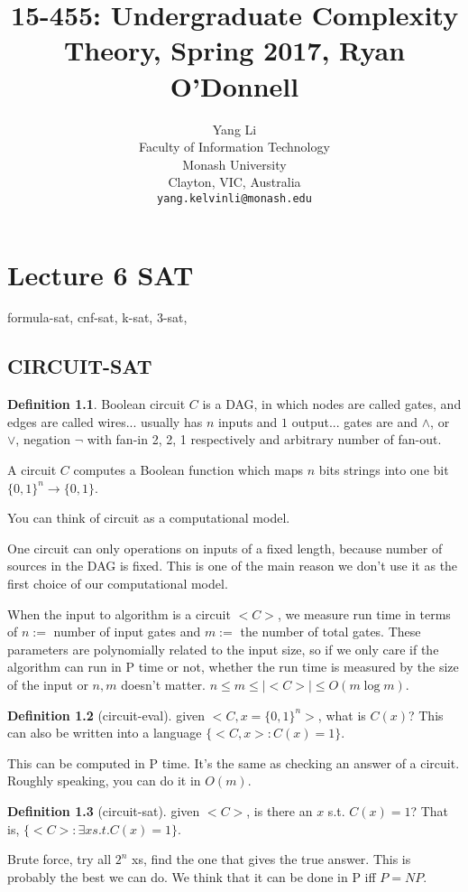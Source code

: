 \documentclass{article}
\title{15-455: Undergraduate Complexity Theory, Spring 2017, Ryan O'Donnell}
\author{
  Yang Li\\
  Faculty of Information Technology\\
  Monash University\\
  Clayton, VIC, Australia \\
  \texttt{yang.kelvinli@monash.edu} \\
}
\theoremstyle{plain}
\theoremstyle{definition}
\newtheorem{definition}{Definition}[section] %
\begin{document}
\maketitle

\chapter{Lecture 6 SAT}

formula-sat, cnf-sat, k-sat, 3-sat, 
\section{CIRCUIT-SAT}

\begin{definition}
Boolean circuit $C$ is a DAG, in which nodes are called gates, and edges are called wires... usually has $n$ inputs and $1$ output... gates are and $\land$, or $\lor$, negation $\lnot$ with fan-in 2, 2, 1 respectively and arbitrary number of fan-out. 
\end{definition}

A circuit $C$ computes a Boolean function which maps $n$ bits strings into one bit $\{0,1\}^n \rightarrow \{0,1\}$. 

You can think of circuit as a computational model.

One circuit can only operations on inputs of a fixed length, because number of sources in the DAG is fixed. This is one of the main reason we don't use it as the first choice of our computational model. 

When the input to algorithm is a circuit $<C>$, we measure run time in terms of $n:=$ number of input gates and $m:=$ the number of total gates. These parameters are polynomially related to the input size, so if we only care if the algorithm can run in P time or not, whether the run time is measured by the size of the input or $n,m$ doesn't matter. $n \le m \le |<C>| \le O(m\log m)$. 

\begin{definition}[circuit-eval]
given $<C,x=\{0,1\}^n>$, what is $C(x)$? This can also be written into a language $\{<C,x>: C(x)=1\}$.
\end{definition}
This can be computed in P time. It's the same as checking an answer of a circuit. Roughly speaking, you can do it in $O(m)$. 

\begin{definition}[circuit-sat]
given $<C>$, is there an $x$ s.t. $C(x)=1$? That is, $\{<C>: \exists x s.t. C(x)=1\}$.
\end{definition}
Brute force, try all $2^n$ xs, find the one that gives the true answer. This is probably the best we can do. We think that it can be done in P iff $P=NP$.
\end{document}
